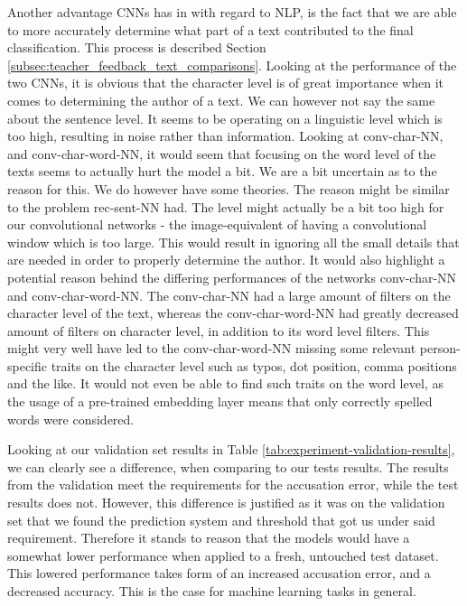 Another advantage \glspl{CNN} has in with regard to \gls{NLP}, is the
fact that we are able to more accurately determine what part of a text
contributed to the final classification. This process is described Section
\ref{subsec:teacher_feedback_text_comparisons}. Looking at the performance
of the two \glspl{CNN}, it is obvious that the character level is of great
importance when it comes to determining the author of a text. We can however not
say the same about the sentence level. It seems to be operating on a linguistic
level which is too high, resulting in noise rather than information. Looking at
\gls{conv-char-NN}, and \gls{conv-char-word-NN}, it would seem that focusing on
the word level of the texts seems to actually hurt the model a bit. We are a
bit uncertain as to the reason for this. We do however have some theories. The
reason might be similar to the problem \gls{rec-sent-NN} had. The level might
actually be a bit too high for our convolutional networks - the image-equivalent
of having a convolutional window which is too large. This would result in
ignoring all the small details that are needed in order to properly determine
the author. It would also highlight a potential reason behind the differing
performances of the networks \gls{conv-char-NN} and \gls{conv-char-word-NN}.
The \gls{conv-char-NN} had a large amount of filters on the character level
of the text, whereas the \gls{conv-char-word-NN} had greatly decreased amount
of filters on character level, in addition to its word level filters. This
might very well have led to the \gls{conv-char-word-NN} missing some relevant
person-specific traits on the character level such as typos, dot position,
comma positions and the like. It would not even be able to find such traits on
the word level, as the usage of a pre-trained embedding layer means that only
correctly spelled words were considered.

Looking at our validation set results in Table
\ref{tab:experiment-validation-results}, we can clearly see a difference,
when comparing to our tests results. The results from the validation meet the
requirements for the accusation error, while the test results does not. However,
this difference is justified as it was on the validation set that we found the
prediction system and threshold that got us under said requirement. Therefore it
stands to reason that the models would have a somewhat lower performance when
applied to a fresh, untouched test dataset. This lowered performance takes form
of an increased accusation error, and a decreased accuracy. This is the case for
machine learning tasks in general.

